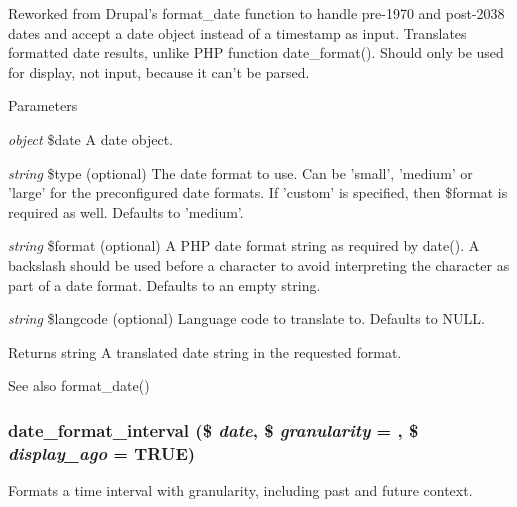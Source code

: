 Reworked from Drupal's format\_\-date function to handle pre-\/1970 and post-\/2038 dates and accept a date object instead of a timestamp as input. Translates formatted date results, unlike PHP function date\_\-format(). Should only be used for display, not input, because it can't be parsed.


\begin{DoxyParams}{Parameters}
\item[{\em object}]\$date A date object. \item[{\em string}]\$type (optional) The date format to use. Can be 'small', 'medium' or 'large' for the preconfigured date formats. If 'custom' is specified, then \$format is required as well. Defaults to 'medium'. \item[{\em string}]\$format (optional) A PHP date format string as required by date(). A backslash should be used before a character to avoid interpreting the character as part of a date format. Defaults to an empty string. \item[{\em string}]\$langcode (optional) Language code to translate to. Defaults to NULL.\end{DoxyParams}
\begin{DoxyReturn}{Returns}
string A translated date string in the requested format.
\end{DoxyReturn}
\begin{DoxySeeAlso}{See also}
format\_\-date() 
\end{DoxySeeAlso}
\hypertarget{date__api_8module_a3a94e28f9a43be71c87afdf5e791b9a0}{
\subsubsection[{date\_\-format\_\-interval}]{\setlength{\rightskip}{0pt plus 5cm}date\_\-format\_\-interval (\$ {\em date}, \/  \$ {\em granularity} = {}, \/  \$ {\em display\_\-ago} = {\ttfamily TRUE})}}
\label{date__api_8module_a3a94e28f9a43be71c87afdf5e791b9a0}
Formats a time interval with granularity, including past and future context.


